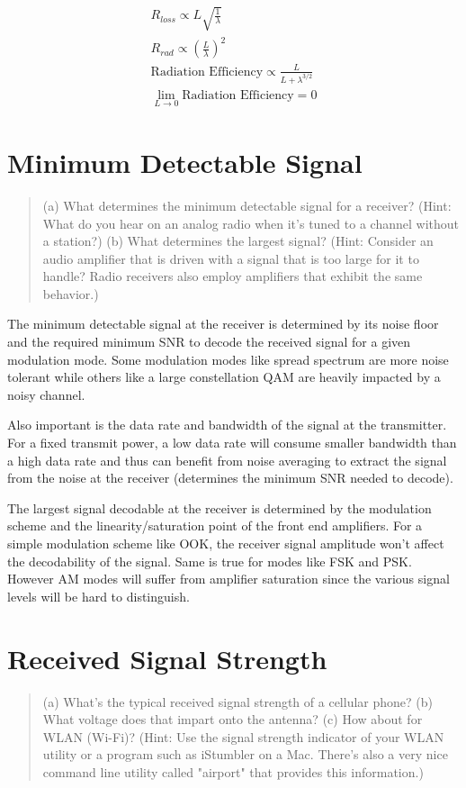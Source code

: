 \documentclass[11pt]{article}
\begin{document}
\begin{eqnarray}
	R_{loss} \propto L \sqrt{\frac{1}{\lambda}} \nonumber \\
	R_{rad} \propto (\frac{L}{\lambda})^2 \nonumber \\
	\text{Radiation Efficiency} \propto \frac{L}{L + \lambda^{3/2}} \nonumber \\
	\lim\limits_{L \rightarrow 0} \text{Radiation Efficiency} = 0 \nonumber
\end{eqnarray}

\section{Minimum Detectable Signal}
\begin{quote}
	(a) What determines the minimum detectable signal for a receiver? (Hint: What do you hear on an analog radio when it's tuned to a channel without a station?) (b)	What determines the largest signal? (Hint: Consider an audio amplifier that is driven with a signal that is too large for it to handle? Radio receivers also employ	amplifiers that exhibit the same behavior.)
\end{quote}

The minimum detectable signal at the receiver is determined by its noise floor and the required minimum SNR to decode the received signal for a given modulation mode. Some modulation modes like spread spectrum are more noise tolerant while others like a large constellation QAM are heavily impacted by a noisy channel. 

Also important is the data rate and bandwidth of the signal at the transmitter. For a fixed transmit power, a low data rate will consume smaller bandwidth than a high data rate and thus can benefit from noise averaging to extract the signal from the noise at the receiver (determines the minimum SNR needed to decode).

The largest signal decodable at the receiver is determined by the modulation scheme and the linearity/saturation point of the front end amplifiers. For a simple modulation scheme like OOK, the receiver signal amplitude won't affect the decodability of the signal. Same is true for modes like FSK and PSK. However AM modes will suffer from amplifier saturation since the various signal levels will be hard to distinguish.

\section{Received Signal Strength}
\begin{quote}
	(a) What's the typical received signal strength of a cellular phone? (b) What voltage does that impart onto the antenna? (c) How about for WLAN (Wi-Fi)? (Hint: Use	the signal strength indicator of your WLAN utility or a program such as iStumbler on a Mac. There's also a very nice command line utility called "airport" that provides this information.)
\end{quote}
\end{document}

